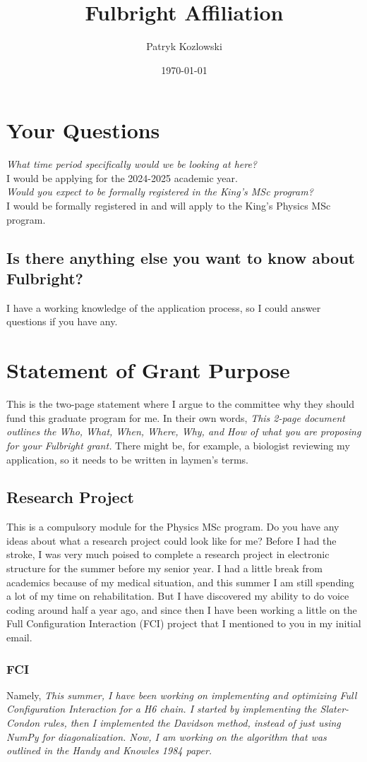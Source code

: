 \documentclass[12pt]{article}
\title{Fulbright Affiliation}
\author{Patryk Kozlowski}
\date{\today}
\begin{document}
\maketitle
\section{Your Questions}
\emph{What time period specifically would we be looking at here?}\\
I would be applying for the 2024-2025 academic year.\\
\emph{Would you expect to be formally registered in the King's MSc program?}\\
I would be formally registered in and will apply to the King's Physics MSc program.\\
\subsection{Is there anything else you want to know about Fulbright?}
I have a working knowledge of the application process, so I could answer questions if you have any.
\section{Statement of Grant Purpose}
This is the two-page statement where I argue to the committee why they should fund this graduate program for me. In their own words, \emph{This 2-page document outlines the Who, What, When, Where, Why, and How of what you are proposing for your Fulbright grant.} There might be, for example, a biologist reviewing my application, so it needs to be written in laymen's terms.
\subsection{Research Project}
This is a compulsory module for the Physics MSc program. Do you have any ideas about what a research project could look like for me? Before I had the stroke, I was very much poised to complete a research project in electronic structure for the summer before my senior year. I had a little break from academics because of my medical situation, and this summer I am still spending a lot of my time on rehabilitation. But I have discovered my ability to do voice coding around half a year ago, and since then I have been working a little on the Full Configuration Interaction (FCI) project that I mentioned to you in my initial email. 
\subsubsection{FCI}
Namely, \emph{This summer, I have been working on implementing and optimizing Full Configuration Interaction for a H6 chain. I started by implementing the Slater-Condon rules, then I implemented the Davidson method, instead of just using NumPy for diagonalization. Now, I am working on the algorithm that was outlined in the Handy and Knowles 1984 paper.}
\end{document}
